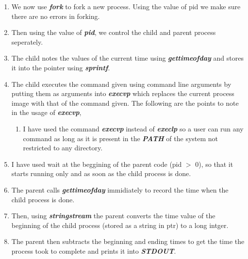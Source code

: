 \documentclass[a4paper,12pt]{report}
\begin{document}
\begin{enumerate}
\item We now use \textbf{\textit{fork}} to fork a new process. Using the value of pid we make sure there are no errors in forking.
\item Then using the value of \textbf{\textit{pid}}, we control the child and parent process seperately.
\item The child notes the values of the current time using \textbf{\textit{gettimeofday}} and stores it into the pointer using \textbf{\textit{sprintf}}.
\item The child executes the command given using command line arguments by putting them as arguments into \textbf{\textit{execvp}} which replaces the current process image with that of the command given. The following are the points to note in the usage of \textbf{\textit{execvp}},
\begin{enumerate}
\item I have used the command \textbf{\textit{execvp}} instead of \textbf{\textit{execlp}} so a user can run any command as long as it is present in the \textbf{\textit{PATH}} of the system not restricted to any directory.
\end{enumerate}
\item I have used wait at the beggining of the parent code (pid $>$ 0), so that it starts running only and as soon as the child process is done.
\item The parent calls \textbf{\textit{gettimeofday}} immidiately to record the time when the child process is done.
\item Then, using \textbf{\textit{stringstream}} the parent converts the time value of the beginning of the child process (stored as a string in ptr) to a long intger.
\item The parent then subtracts the beginning and ending times to get the time the process took to complete and prints it into \textbf{\textit{STDOUT}}.
\end{enumerate}
\newpage
\end{document}
